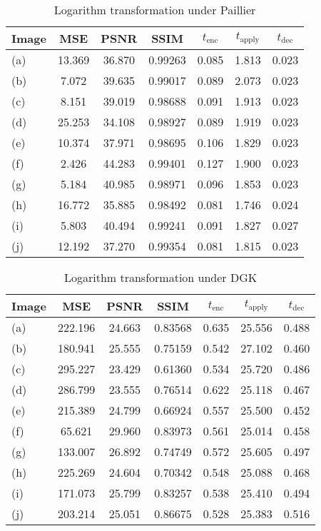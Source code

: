\begin{table}[t]
	\centering
	\caption{Logarithm transformation under Paillier}
	\label{tbl:log-pal}
    \begin{tabular}{lcccccc}
        \hline
        Image & MSE  & PSNR & SSIM & $t_\text{enc}$ & $t_\text{apply}$ & $t_\text{dec}$ \\ \hline
		(a) & 13.369 & 36.870 & 0.99263 & 0.085 & 1.813 & 0.023 \\
		(b) & 7.072 & 39.635 & 0.99017 & 0.089 & 2.073 & 0.023 \\
		(c) & 8.151 & 39.019 & 0.98688 & 0.091 & 1.913 & 0.023 \\
		(d) & 25.253 & 34.108 & 0.98927 & 0.089 & 1.919 & 0.023 \\
		(e) & 10.374 & 37.971 & 0.98695 & 0.106 & 1.829 & 0.023 \\
		(f) & 2.426 & 44.283 & 0.99401 & 0.127 & 1.900 & 0.023 \\
		(g) & 5.184 & 40.985 & 0.98971 & 0.096 & 1.853 & 0.023 \\
		(h) & 16.772 & 35.885 & 0.98492 & 0.081 & 1.746 & 0.024 \\
		(i) & 5.803 & 40.494 & 0.99241 & 0.091 & 1.827 & 0.027 \\
		(j) & 12.192 & 37.270 & 0.99354 & 0.081 & 1.815 & 0.023 \\
		\hline
        \end{tabular}
\end{table}

\begin{table}[t]
    \centering
	\caption{Logarithm transformation under DGK}
	\label{tbl:log-dgk}
    \begin{tabular}{lcccccc}
        \hline
        Image & MSE  & PSNR & SSIM & $t_\text{enc}$ & $t_\text{apply}$ & $t_\text{dec}$ \\ \hline
		(a) & 222.196 & 24.663 & 0.83568 & 0.635 & 25.556 & 0.488 \\
		(b) & 180.941 & 25.555 & 0.75159 & 0.542 & 27.102 & 0.460 \\
		(c) & 295.227 & 23.429 & 0.61360 & 0.534 & 25.720 & 0.486 \\
		(d) & 286.799 & 23.555 & 0.76514 & 0.622 & 25.118 & 0.467 \\
		(e) & 215.389 & 24.799 & 0.66924 & 0.557 & 25.500 & 0.452 \\
		(f) & 65.621 & 29.960 & 0.83973 & 0.561 & 25.014 & 0.458 \\
		(g) & 133.007 & 26.892 & 0.74749 & 0.572 & 25.605 & 0.497 \\
		(h) & 225.269 & 24.604 & 0.70342 & 0.548 & 25.088 & 0.468 \\
		(i) & 171.073 & 25.799 & 0.83257 & 0.538 & 25.410 & 0.494 \\
		(j) & 203.214 & 25.051 & 0.86675 & 0.528 & 25.383 & 0.516 \\
		\hline
    \end{tabular}
\end{table}

